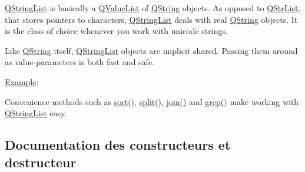 \hyperlink{class_q_string_list}{Q\+String\+List} is basically a \hyperlink{class_q_value_list}{Q\+Value\+List} of \hyperlink{class_q_string}{Q\+String} objects. As opposed to \hyperlink{class_q_str_list}{Q\+Str\+List}, that stores pointers to characters, \hyperlink{class_q_string_list}{Q\+String\+List} deals with real \hyperlink{class_q_string}{Q\+String} objects. It is the class of choice whenever you work with unicode strings.

Like \hyperlink{class_q_string}{Q\+String} itself, \hyperlink{class_q_string_list}{Q\+String\+List} objects are implicit shared. Passing them around as value-\/parameters is both fast and safe.

\hyperlink{struct_example}{Example}\+: 


Convenience methods such as \hyperlink{class_q_string_list_a1b3bf672d6dd980fb487e9392fdd9bd6}{sort()}, \hyperlink{class_q_string_list_a2c21b167a54aa8a8082996d7f18ca5bd}{split()}, \hyperlink{class_q_string_list_a302a422f6f4060eb02d4793d3788e4cc}{join()} and \hyperlink{class_q_string_list_a7e9abb1e84c5c8c164f4741f7de1bd9a}{grep()} make working with \hyperlink{class_q_string_list}{Q\+String\+List} easy. 

\subsection{Documentation des constructeurs et destructeur}
\hypertarget{class_q_string_list_a3e6ca70816297d8ad4b7baa749a0b8e2}{}
